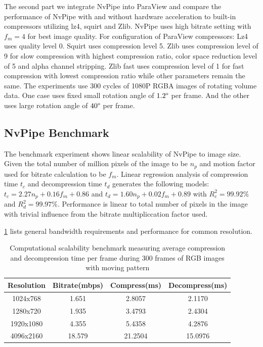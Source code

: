 \documentclass[review]{vgtc}                 %
\begin{document}
The second part we integrate NvPipe into ParaView and compare the performance of NvPipe with and without hardware acceleration to built-in compressors utilizing lz4, squirt and Zlib. NvPipe uses high bitrate setting with \(f_m=4\) for best image quality. For configuration of ParaView compressors: Lz4 uses quality level 0. Squirt uses compression level 5. Zlib uses compression level of 9 for slow compression with highest compression ratio, color space reduction level of 5 and alpha channel stripping. Zlib fast uses compression level of 1 for fast compression with lowest compression ratio while other parameters remain the same. The experiments use 300 cycles of 1080P RGBA images of rotating volume data. One case uses fixed small rotation angle of \(1.2\degree\) per frame. And the other uses large rotation angle of \(40\degree\) per frame.

\subsection{NvPipe Benchmark}

The benchmark experiment shows linear scalability of NvPipe to image size. Given the total number of million pixels of the image to be \(n_p\) and motion factor used for bitrate calculation to be \(f_m\). Linear regression analysis of compression time \(t_c\) and decompression time \(t_d\) generates the following models: \(t_c=2.27n_p+0.16f_m+0.86\) and \(t_d=1.60n_p+0.02f_m+0.89\) with \(R^2_c=99.92\%\) and \(R^2_d=99.97\%\). Performance is linear to total number of pixels in the image with trivial influence from the bitrate multipliccation factor used.
%

\cref{tab:experiment_setup} lists general bandwidth requirements and performance for common resolution. 

\begin{table}[h]
  \caption{Computational scalability benchmark measuring average compression and decompression time per frame during 300 frames of RGB images with moving pattern}
  \label{tab:experiment_setup}
  \scriptsize
  \begin{center}
    \begin{tabular}{cccc}
      Resolution & Bitrate(mbps) & Compress(ms) & Decompress(ms)\\
    \hline
      1024x768 & 1.651 & 2.8057 & 2.1170\\
      1280x720 & 1.935 & 3.4793 & 2.4304\\
      1920x1080 & 4.355 & 5.4358 & 4.2876\\
      4096x2160 & 18.579 & 21.2504 & 15.0976
    \end{tabular}
  \end{center}
\end{table}
\end{document}
